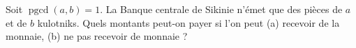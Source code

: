 Soit $\operatorname{pgcd}(a, b) = 1$. La Banque centrale de Sikinie n'émet que des pièces de $a$ et de $b$ kulotniks. Quels montants peut-on payer si l'on peut (a) recevoir de la monnaie, (b) ne pas recevoir de monnaie ?
